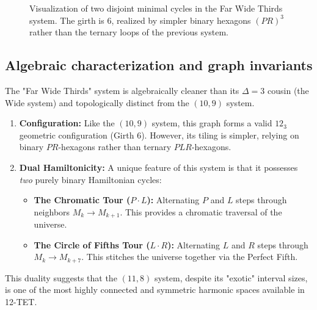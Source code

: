 \documentclass[12pt,letterpaper]{amsart}
\begin{document}
\begin{figure}[H]
    \caption{Visualization of two disjoint minimal cycles in the Far Wide Thirds system. The girth is 6, realized by simpler binary hexagons $(PR)^3$ rather than the ternary loops of the previous system.}
    \label{fig:minimal_hexagons_delta11_8}
\end{figure}

\subsection{Algebraic characterization and graph invariants}
The "Far Wide Thirds" system is algebraically cleaner than its $\Delta=3$ cousin (the Wide system) and topologically distinct from the $(10,9)$ system.

\begin{enumerate}
    \item \textbf{Configuration:} Like the $(10,9)$ system, this graph forms a valid $12_3$ geometric configuration (Girth 6). However, its tiling is simpler, relying on binary $PR$-hexagons rather than ternary $PLR$-hexagons.
    
    \item \textbf{Dual Hamiltonicity:} A unique feature of this system is that it possesses \textit{two} purely binary Hamiltonian cycles:
    \begin{itemize}
        \item \textbf{The Chromatic Tour ($P \cdot L$):} Alternating $P$ and $L$ steps through neighbors $M_k \to M_{k+1}$. This provides a chromatic traversal of the universe.
        \item \textbf{The Circle of Fifths Tour ($L \cdot R$):} Alternating $L$ and $R$ steps through $M_k \to M_{k+7}$. This stitches the universe together via the Perfect Fifth.
    \end{itemize}
\end{enumerate}
This duality suggests that the $(11,8)$ system, despite its "exotic" interval sizes, is one of the most highly connected and symmetric harmonic spaces available in 12-TET.
\end{document}
